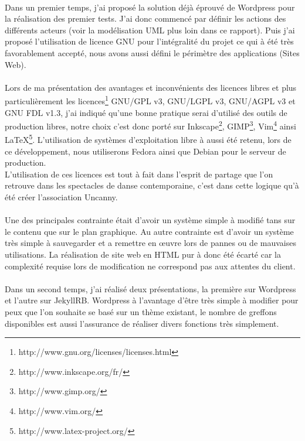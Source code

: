 \documentclass[11pt,a4paper]{report}
\begin{document}
		\paragraph*{}Dans un premier temps, j'ai proposé la solution déjà éprouvé de Wordpress pour la réalisation des premier tests. J'ai donc commencé par définir les actions des différents acteurs (voir la modélisation UML plus loin dans ce rapport). Puis j'ai proposé l'utilisation de licence GNU pour l'intégralité du projet ce qui à été très favorablement accepté, nous avons aussi défini le périmètre des applications (Sites Web).
		\paragraph*{}Lors de ma présentation des avantages et inconvénients des licences libres et plus particulièrement les licences\footnote{http://www.gnu.org/licenses/licenses.html} GNU/GPL v3, GNU/LGPL v3, GNU/AGPL v3 et GNU FDL v1.3, j'ai indiqué qu'une bonne pratique serai d'utilisé des outils de production libres, notre choix c'est donc porté sur Inkscape\footnote{http://www.inkscape.org/fr/}, GIMP\footnote{http://www.gimp.org/}, Vim\footnote{http://www.vim.org/} ainsi \LaTeX \footnote{http://www.latex-project.org/}. L'utilisation de systèmes d'exploitation libre à aussi été retenu, lors de ce développement, nous utiliserons Fedora ainsi que Debian pour le serveur de production.\\
		L'utilisation de ces licences est tout à fait dans l'esprit de partage que l'on retrouve dans les spectacles de danse contemporaine, c'est dans cette logique qu'à été créer l'association Uncanny.
		\paragraph*{}Une des principales contrainte était d'avoir un système simple à modifié tans sur le contenu que sur le plan graphique. Au autre contrainte est d'avoir un système très simple à sauvegarder et a remettre en œuvre lors de pannes ou de mauvaises utilisations. La réalisation de site web en HTML pur à donc été écarté car la complexité requise lors de modification ne correspond pas aux attentes du client.
		\paragraph*{}Dans un second temps, j'ai réalisé deux présentations, la première sur Wordpress et l'autre sur JekyllRB.
		Wordpress à l'avantage d'être très simple à modifier pour peux que l'on souhaite se basé sur un thème existant, le nombre de greffons disponibles est aussi l'assurance de réaliser divers fonctions très simplement.
\end{document}
